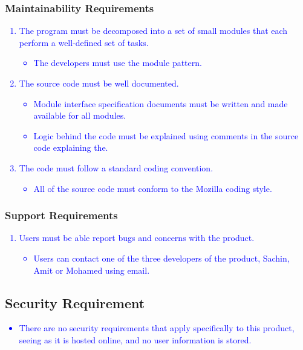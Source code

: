 \documentclass[12pt]{article}
\begin{document}
\subsubsection{Maintainability Requirements}
\textcolor{blue}{
\begin{enumerate}
    \item The program must be decomposed into a set of small modules that each perform a well-defined set of tasks.
    \begin{itemize}
        \item The developers must use the module pattern.
    \end{itemize}
    \item The source code must be well documented.
    \begin{itemize}
        \item Module interface specification documents must be written and made available for all modules.
        \item Logic behind the code must be explained using comments in the source code explaining the.
    \end{itemize}
    \item The code must follow a standard coding convention.
    \begin{itemize}
        \item All of the source code must conform to the Mozilla coding style.
    \end{itemize}
\end{enumerate}
}
\subsubsection{Support Requirements}
\textcolor{blue}{
\begin{enumerate}
    \item Users must be able report bugs and concerns with the product.
    \begin{itemize}
        \item Users can contact one of the three developers of the product, Sachin, Amit or Mohamed using email.
    \end{itemize}
\end{enumerate}
}
\subsection{Security Requirement}
\textcolor{blue}{
\begin{itemize}
    \item There are no security requirements that apply specifically to this product, seeing as it is hosted online, and no user information is stored.
\end{itemize}
}
\end{document}
